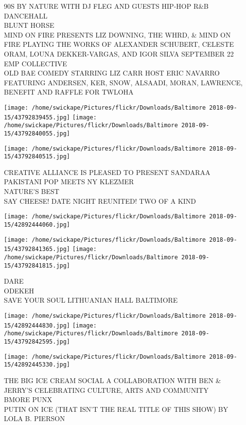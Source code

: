 \documentclass[10pt,letterpaper]{article}
\begin{document}
90S BY NATURE WITH DJ FLEG AND GUESTS HIP{-}HOP R\&B DANCEHALL\\
BLUNT HORSE\\
MIND ON FIRE PRESENTS LIZ DOWNING, THE WHRD, \& MIND ON FIRE PLAYING THE WORKS OF ALEXANDER SCHUBERT, CELESTE ORAM, LOUNA DEKKER{-}VARGAS, AND IGOR SILVA SEPTEMBER 22 EMP COLLECTIVE\\
OLD BAE COMEDY STARRING LIZ CARR HOST ERIC NAVARRO FEATURING ANDERSEN, KER, SNOW, ALSAADI, MORAN, LAWRENCE, BENEFIT AND RAFFLE FOR TWLOHA
\pagebreak

\texttt{[image: /home/swickape/Pictures/flickr/Downloads/Baltimore 2018-09-15/43792839455.jpg]}
\texttt{[image: /home/swickape/Pictures/flickr/Downloads/Baltimore 2018-09-15/43792840055.jpg]}

\texttt{[image: /home/swickape/Pictures/flickr/Downloads/Baltimore 2018-09-15/43792840515.jpg]}

CREATIVE ALLIANCE IS PLEASED TO PRESENT SANDARAA PAKISTANI POP MEETS NY KLEZMER\\
NATURE'S BEST\\
SAY CHEESE!  DATE NIGHT  REUNITED!  TWO OF A KIND
\pagebreak

\texttt{[image: /home/swickape/Pictures/flickr/Downloads/Baltimore 2018-09-15/42892444060.jpg]}

\vspace{0.25in}
\texttt{[image: /home/swickape/Pictures/flickr/Downloads/Baltimore 2018-09-15/43792841365.jpg]}
\texttt{[image: /home/swickape/Pictures/flickr/Downloads/Baltimore 2018-09-15/43792841815.jpg]}

DARE\\
ODEKEH\\
SAVE YOUR SOUL LITHUANIAN HALL BALTIMORE
\pagebreak

\texttt{[image: /home/swickape/Pictures/flickr/Downloads/Baltimore 2018-09-15/42892444830.jpg]}
\texttt{[image: /home/swickape/Pictures/flickr/Downloads/Baltimore 2018-09-15/43792842595.jpg]}

\texttt{[image: /home/swickape/Pictures/flickr/Downloads/Baltimore 2018-09-15/42892445330.jpg]}

THE BIG ICE CREAM SOCIAL A COLLABORATION WITH BEN \& JERRY'S CELEBRATING CULTURE, ARTS AND COMMUNITY\\
BMORE PUNX\\
PUTIN ON ICE (THAT ISN'T THE REAL TITLE OF THIS SHOW) BY LOLA B. PIERSON
\pagebreak
\end{document}

